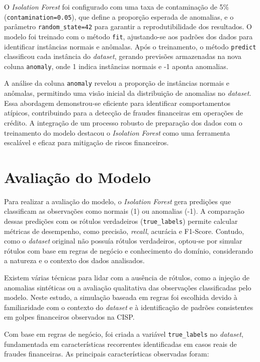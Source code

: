 \documentclass[12pt,a4paper]{article}
\begin{document}
O \textit{Isolation Forest} foi configurado com uma taxa de contaminação de 5\% (\texttt{contamination=0.05}), que define a proporção esperada de anomalias, e o parâmetro \texttt{random\_state=42} para garantir a reprodutibilidade dos resultados. O modelo foi treinado com o método \texttt{fit}, ajustando-se aos padrões dos dados para identificar instâncias normais e anômalas. Após o treinamento, o método \texttt{predict} classificou cada instância do \textit{dataset}, gerando previsões armazenadas na nova coluna \texttt{anomaly}, onde 1 indica instâncias normais e -1 aponta anomalias.

A análise da coluna \texttt{anomaly} revelou a proporção de instâncias normais e anômalas, permitindo uma visão inicial da distribuição de anomalias no \textit{dataset}. Essa abordagem demonstrou-se eficiente para identificar comportamentos atípicos, contribuindo para a detecção de fraudes financeiras em operações de crédito. A integração de um processo robusto de preparação dos dados com o treinamento do modelo destacou o \textit{Isolation Forest} como uma ferramenta escalável e eficaz para mitigação de riscos financeiros.

\section{Avaliação do Modelo}

Para realizar a avaliação do modelo, o \textit{Isolation Forest} gera predições que classificam as observações como normais (1) ou anomalias (-1). A comparação dessas predições com os rótulos verdadeiros (\texttt{true\_labels}) permite calcular métricas de desempenho, como precisão, \textit{recall}, acurácia e F1-Score. Contudo, como o \textit{dataset} original não possuía rótulos verdadeiros, optou-se por simular rótulos com base em regras de negócio e conhecimento do domínio, considerando a natureza e o contexto dos dados analisados.

Existem várias técnicas para lidar com a ausência de rótulos, como a injeção de anomalias sintéticas ou a avaliação qualitativa das observações classificadas pelo modelo. Neste estudo, a simulação baseada em regras foi escolhida devido à familiaridade com o contexto do \textit{dataset} e à identificação de padrões consistentes em golpes financeiros observados na CISP.

Com base em regras de negócio, foi criada a variável \texttt{true\_labels} no \textit{dataset}, fundamentada em características recorrentes identificadas em casos reais de fraudes financeiras. As principais características observadas foram:
\end{document}
